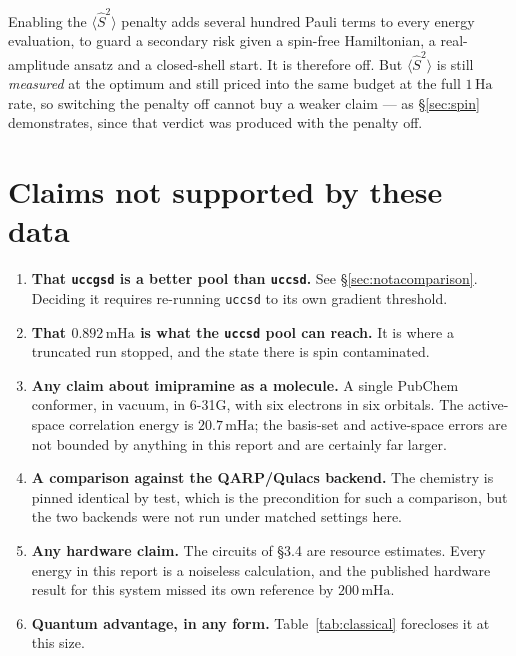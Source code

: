 \documentclass[11pt,a4paper]{article}
\newcommand{\mHa}{\ensuremath{\,\mathrm{mHa}}}
\newcommand{\Ha}{\ensuremath{\,\mathrm{Ha}}}
\newcommand{\Ssq}{\ensuremath{\langle \hat{S}^2 \rangle}}
\newcommand{\code}[1]{\texttt{\small #1}}
\begin{document}
Enabling the $\Ssq$ penalty adds several hundred Pauli terms to every energy
evaluation, to guard a secondary risk given a spin-free Hamiltonian, a
real-amplitude ansatz and a closed-shell start. It is therefore off. But $\Ssq$
is still \emph{measured} at the optimum and still priced into the same budget at
the full $1\Ha$ rate, so switching the penalty off cannot buy a weaker claim ---
as \S\ref{sec:spin} demonstrates, since that verdict was produced with the
penalty off.

\section{Claims not supported by these data}

\begin{enumerate}[leftmargin=1.4em,itemsep=0.3em]

\item \textbf{That \code{uccgsd} is a better pool than \code{uccsd}.} See
  \S\ref{sec:notacomparison}. Deciding it requires re-running \code{uccsd} to
  its own gradient threshold.

\item \textbf{That $0.892\mHa$ is what the \code{uccsd} pool can reach.} It is
  where a truncated run stopped, and the state there is spin contaminated.

\item \textbf{Any claim about imipramine as a molecule.} A single PubChem
  conformer, in vacuum, in 6-31G, with six electrons in six orbitals. The
  active-space correlation energy is $20.7\mHa$; the basis-set and
  active-space errors are not bounded by anything in this report and are
  certainly far larger.

\item \textbf{A comparison against the QARP/Qulacs backend.} The chemistry is
  pinned identical by test, which is the precondition for such a comparison, but
  the two backends were not run under matched settings here.

\item \textbf{Any hardware claim.} The circuits of \S3.4 are resource estimates.
  Every energy in this report is a noiseless calculation, and the published
  hardware result for this system missed its own reference by $200\mHa$.

\item \textbf{Quantum advantage, in any form.} Table~\ref{tab:classical}
  forecloses it at this size.

\end{enumerate}
\end{document}
